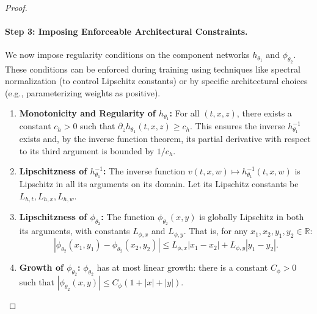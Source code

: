 \documentclass[qian]{imsart}
\newcommand{\R}{\mathbb{R}}
\theoremstyle{plain}
\theoremstyle{definition}
\begin{document}
\begin{proof}
\paragraph{Step 3: Imposing Enforceable Architectural Constraints.}
We now impose regularity conditions on the component networks $h_{\theta_1}$ and $\phi_{\theta_2}$. These conditions can be enforced during training using techniques like spectral normalization (to control Lipschitz constants) or by specific architectural choices (e.g., parameterizing weights as positive).
\begin{enumerate}[label=(C\arabic*), leftmargin=*]
    \item \textbf{Monotonicity and Regularity of $h_{\theta_1}$:} For all $(t,x,z)$, there exists a constant $c_h > 0$ such that $\partial_z h_{\theta_1}(t,x,z) \ge c_h$. This ensures the inverse $h_{\theta_1}^{-1}$ exists and, by the inverse function theorem, its partial derivative with respect to its third argument is bounded by $1/c_h$.
    \item \textbf{Lipschitzness of $h_{\theta_1}^{-1}$:} The inverse function $v(t,x,w) \mapsto h_{\theta_1}^{-1}(t,x,w)$ is Lipschitz in all its arguments on its domain. Let its Lipschitz constants be $L_{h,t}, L_{h,x}, L_{h,w}$.
    \item \textbf{Lipschitzness of $\phi_{\theta_2}$:} The function $\phi_{\theta_2}(x,y)$ is globally Lipschitz in both its arguments, with constants $L_{\phi,x}$ and $L_{\phi,y}$. That is, for any $x_1, x_2, y_1, y_2 \in \R$:
    \[ |\phi_{\theta_2}(x_1, y_1) - \phi_{\theta_2}(x_2, y_2)| \le L_{\phi,x}|x_1-x_2| + L_{\phi,y}|y_1-y_2|. \]
    \item \textbf{Growth of $\phi_{\theta_2}$:} $\phi_{\theta_2}$ has at most linear growth: there is a constant $C_\phi > 0$ such that $|\phi_{\theta_2}(x,y)| \le C_\phi(1+|x|+|y|)$.
\end{enumerate}


\end{proof}
\end{document}
